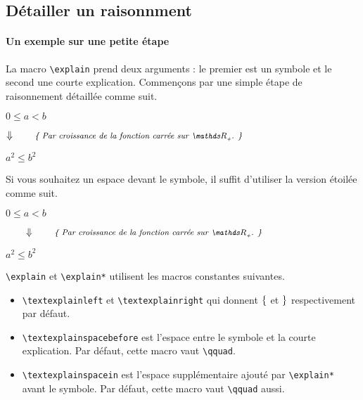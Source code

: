 \documentclass[12pt,a4paper]{article}
\theoremstyle{definition}
\begin{document}

    \subsection{Détailler un raisonnment} \label{explain-proof}
    
	    \paragraph{Un exemple sur une petite étape}
    
La macro \verb+\explain+ prend deux arguments : le premier est un symbole et le second une courte explication. Commençons par une simple étape de raisonnement détaillée comme suit.

\begin{tcblisting}{}
$0 \leq a < b$

$\explain{\vimplies}{Par croissance de la fonction carrée sur $\RRp$.}$

$a^2 \leq b^2$
\end{tcblisting}

Si vous souhaitez un espace devant le symbole, il suffit d'utiliser la version étoilée comme suit.

\begin{tcblisting}{}
$0 \leq a < b$

$\explain*{\vimplies}{Par croissance de la fonction carrée sur $\RRp$.}$

$a^2 \leq b^2$
\end{tcblisting}
	

\verb+\explain+ et \verb+\explain*+ utilisent les macros constantes suivantes.
\begin{itemize}
	\item \verb+\textexplainleft+ et \verb+\textexplainright+ qui donnent $\{$ et $\}$ respectivement par défaut.
	
	\item \verb+\textexplainspacebefore+ est l'espace entre le symbole et la courte explication. Par défaut, cette macro vaut \verb+\qquad+.
	
	\item \verb+\textexplainspacein+ est l'espace supplémentaire ajouté par \verb+\explain*+ avant le symbole. Par défaut, cette macro vaut \verb+\qquad+ aussi.	
\end{itemize}
\end{document}
